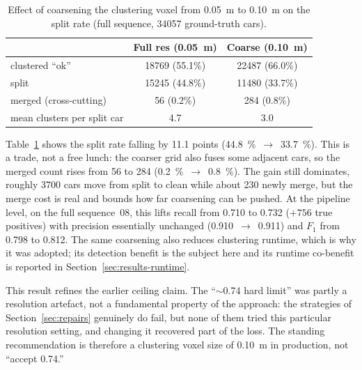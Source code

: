 \begin{table}[H]
  \centering
  \caption[Effect of coarsening the clustering voxel]{Effect of coarsening the clustering
    voxel from \SI{0.05}{\metre} to \SI{0.10}{\metre} on the split rate (full sequence,
    \num{34057} ground-truth cars).}
  \label{tab:splitrate}
  \begin{tabular}{lcc}
    \toprule
    & Full res (\SI{0.05}{\metre}) & Coarse (\SI{0.10}{\metre}) \\
    \midrule
    clustered ``ok''            & 18769 (55.1\%) & 22487 (66.0\%) \\
    split                        & 15245 (44.8\%) & 11480 (33.7\%) \\
    merged (cross-cutting)       & 56 (0.2\%)     & 284 (0.8\%)    \\
    mean clusters per split car  & 4.7            & 3.0 \\
    \bottomrule
  \end{tabular}
\end{table}

Table~\ref{tab:splitrate} shows the split rate falling by \num{11.1} points
(\SI{44.8}{\percent}~$\rightarrow$~\SI{33.7}{\percent}). This is a trade, not a
free lunch: the coarser grid also fuses some adjacent cars, so the merged count
rises from \num{56} to \num{284} (\SI{0.2}{\percent}~$\rightarrow$~\SI{0.8}{\percent}).
The gain still dominates, roughly \num{3700} cars move from split to clean while
about \num{230} newly merge, but the merge cost is real and bounds how far
coarsening can be pushed.
At the pipeline level, on the full sequence~08, this lifts recall from \num{0.710} to
\num{0.732} ($+\num{756}$ true positives) with precision essentially unchanged
(\num{0.910}~$\rightarrow$~\num{0.911}) and $F_1$ from \num{0.798} to \num{0.812}. The same coarsening also reduces clustering runtime, which is why it
was adopted; its detection benefit is the subject here and its runtime co-benefit is
reported in Section~\ref{sec:results-runtime}.

This result refines the earlier ceiling claim. The ``$\sim$\num{0.74}
hard limit'' was partly a resolution artefact, not a fundamental property of
the approach: the strategies of Section~\ref{sec:repairs} genuinely do fail, but none
of them tried this particular resolution setting, and changing it recovered part of
the loss. The standing recommendation is therefore
a clustering voxel size of \SI{0.10}{\metre} in production, not ``accept
\num{0.74}.''

